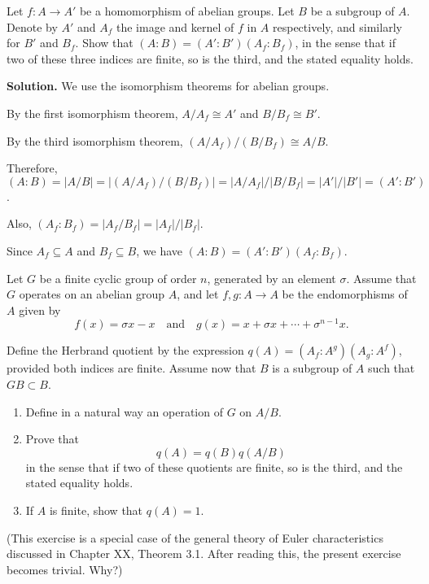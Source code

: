 \begin{problembox}
Let $f: A \to A'$ be a homomorphism of abelian groups. Let $B$ be a subgroup of $A$. Denote by $A'$ and $A_f$ the image and kernel of $f$ in $A$ respectively, and similarly for $B'$ and $B_f$. Show that $(A : B) = (A' : B')(A_f : B_f)$, in the sense that if two of these three indices are finite, so is the third, and the stated equality holds.
\end{problembox}

\noindent\textbf{Solution.} We use the isomorphism theorems for abelian groups.

By the first isomorphism theorem, $A/A_f \cong A'$ and $B/B_f \cong B'$.

By the third isomorphism theorem, $(A/A_f)/(B/B_f) \cong A/B$.

Therefore, $(A : B) = |A/B| = |(A/A_f)/(B/B_f)| = |A/A_f|/|B/B_f| = |A'|/|B'| = (A' : B')$.

Also, $(A_f : B_f) = |A_f/B_f| = |A_f|/|B_f|$.

Since $A_f \subseteq A$ and $B_f \subseteq B$, we have $(A : B) = (A' : B')(A_f : B_f)$.

\begin{problembox}
Let $G$ be a finite cyclic group of order $n$, generated by an element $\sigma$. Assume that $G$ operates on an abelian group $A$, and let $f, g : A \to A$ be the endomorphisms of $A$ given by
\[f(x) = \sigma x - x \quad \text{and} \quad g(x) = x + \sigma x + \cdots + \sigma^{n-1}x.\]

Define the Herbrand quotient by the expression $q(A) = (A_f : A^g)(A_g : A^f)$, provided both indices are finite. Assume now that $B$ is a subgroup of $A$ such that $GB \subset B$.
\begin{enumerate}[label=(\alph*)]
\item Define in a natural way an operation of $G$ on $A/B$.
\item Prove that
\[q(A) = q(B)q(A/B)\]
in the sense that if two of these quotients are finite, so is the third, and the stated equality holds.
\item If $A$ is finite, show that $q(A) = 1$.
\end{enumerate}
(This exercise is a special case of the general theory of Euler characteristics discussed in Chapter XX, Theorem 3.1. After reading this, the present exercise becomes trivial. Why?)
\end{problembox}

